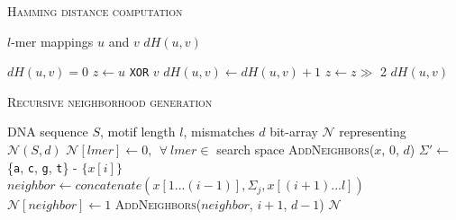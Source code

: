\documentclass[oneside,12pt]{DISCSthesis}
\begin{document}
{		\newpage

		{ %
			\noindent \hspace*{6pt}{\bf Algorithm 2.2} \textsc{Hamming distance computation}\small
			\begin{algorithmic}[1]\label{alg:hamming-distance-comp}
				\Require $l$-mer mappings $u$ and $v$
				\Ensure $dH(u,v)$\vspace*{6pt}

				\State $dH(u,v) = 0$
				\State $z \leftarrow u$ \texttt{XOR} $v$
				\State $dH(u,v) \leftarrow dH(u,v) + 1$
				\EndIf
				\State $z \leftarrow z \gg$ 2 			\hspace{150pt}
				\EndFor
				\State\Return $dH(u,v)$
				\end{algorithmic}
			}

			\bigskip\bigskip\bigskip

		{ %
			\noindent \hspace*{6pt}{\bf Algorithm 2.3} \textsc{Recursive neighborhood generation}\small
			\begin{algorithmic}[1]
				\label{alg:recursive-nbr-gen}
				\Require DNA sequence $S$, motif length $l$, mismatches $d$
				\Ensure bit-array $\mathcal{N}$ representing $\mathcal{N}(S,d)$ \vspace*{6pt}
				\State $\mathcal{N}[lmer] \leftarrow 0,\ \ \forall\ lmer \in $ search space 
				\State \textsc{AddNeighbors}($x$, 0, $d$) \hspace*{79pt}
				\EndFor
				\newline
				\State {}
						\State $\Sigma' \leftarrow$ \{\texttt{a}, \texttt{c}, \texttt{g}, \texttt{t}\} - $\{x[i]\}$ \hspace*{79pt}
							\State $neighbor \leftarrow concatenate(x[1...(i-1)],\Sigma_{j},x[(i+1)...l])$
							\State $\mathcal{N}[neighbor] \leftarrow 1$				\hspace*{100pt}
								\State \textsc{AddNeighbors}($neighbor$, $i+1$, $d-1$)
							\EndIf
						\EndFor
					\EndFor
				\EndProcedure
				\State\Return $\mathcal{N}$
				\end{algorithmic}
			}

}
\end{document}
